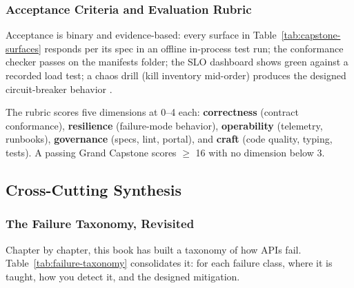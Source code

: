 \subsubsection{Acceptance Criteria and Evaluation Rubric}

Acceptance is binary and evidence-based: every surface in
Table~\ref{tab:capstone-surfaces} responds per its spec in an offline
in-process test run; the conformance checker passes on the manifests folder;
the SLO dashboard shows green against a recorded load test; a chaos drill
(kill inventory mid-order) produces the designed circuit-breaker behavior
\cite{nygard2018releaseit}.

The rubric scores five dimensions at 0--4 each: \textbf{correctness}
(contract conformance), \textbf{resilience} (failure-mode behavior),
\textbf{operability} (telemetry, runbooks), \textbf{governance} (specs,
lint, portal), and \textbf{craft} (code quality, typing, tests).
A passing Grand Capstone scores $\geq$ 16 with no dimension below 3.

\subsection{Cross-Cutting Synthesis}
\label{sec:synthesis}

\subsubsection{The Failure Taxonomy, Revisited}

Chapter by chapter, this book has built a taxonomy of how APIs fail.
Table~\ref{tab:failure-taxonomy} consolidates it: for each failure class,
where it is taught, how you detect it, and the designed mitigation.

